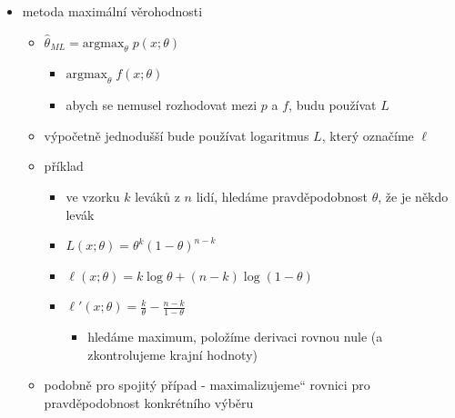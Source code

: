 \begin{itemize}
\begin{itemize}
\begin{itemize}
\item $r$-tý moment $X$ \dots{} $\mathbb E(X^r)=m_r(\theta)$
\item $r$-tý výběrový moment \dots{} $\frac1n\sum_{i=1}^n X_i^r=\widehat{m_r}$
\begin{itemize}
\item konzistentní nevychýlený odhad pro $r$-tý moment
\end{itemize}
\item nalezneme $\theta$ takové, že $m_r(\theta)=\widehat{m_r}$
\item typicky stačí použít první moment, dostaneme nějakou rovnici
\item $m_1=\mu$
\item $m_2=\mathbb E(X^2)=\text{var}(X)+(\mathbb EX)^2=\sigma^2+\mu^2$
\end{itemize}
\item metoda maximální věrohodnosti
\begin{itemize}
\item $\hat\theta_{ML}=\text{argmax}_\theta\;p(x;\theta)$
\begin{itemize}
\item $\text{argmax}_\theta\;f(x;\theta)$
\item abych se nemusel rozhodovat mezi $p$ a $f$, budu používat $L$
\end{itemize}
\item výpočetně jednodušší bude používat logaritmus $L$, který označíme $\ell$
\item příklad
\begin{itemize}
\item ve vzorku $k$ leváků z $n$ lidí, hledáme pravděpodobnost $\theta$, že je někdo levák
\item $L(x;\theta)=\theta^k(1-\theta)^{n-k}$
\item $\ell(x;\theta)=k\log\theta+(n-k)\log(1-\theta)$
\item $\ell'(x;\theta)=\frac k\theta-\frac{n-k}{1-\theta}$
\begin{itemize}
\item hledáme maximum, položíme derivaci rovnou nule (a zkontrolujeme krajní hodnoty)
\end{itemize}
\end{itemize}
\item podobně pro spojitý případ - \quotedblbase{}maximalizujeme\textquotedblleft{} rovnici pro pravděpodobnost konkrétního výběru
\end{itemize}
\end{itemize}

\end{itemize}
